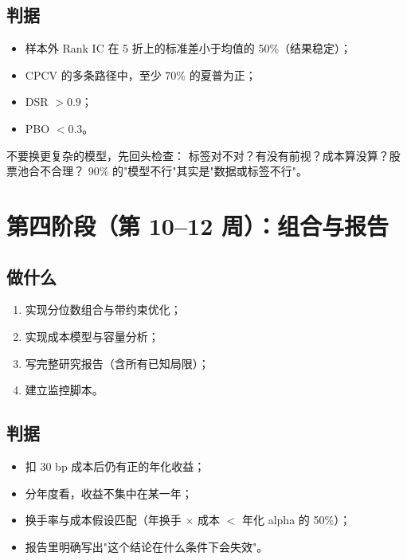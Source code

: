 \subsection{判据}

\begin{itemize}
  \item 样本外 Rank IC 在 5 折上的标准差小于均值的 50\%（结果稳定）；
  \item CPCV 的多条路径中，至少 70\% 的夏普为正；
  \item DSR $>0.9$；
  \item PBO $<0.3$。
\end{itemize}

\begin{warnbox}[如果达不到]
不要换更复杂的模型，先回头检查：
标签对不对？有没有前视？成本算没算？股票池合不合理？
90\% 的"模型不行"其实是"数据或标签不行"。
\end{warnbox}

\section{第四阶段（第 10--12 周）：组合与报告}

\subsection{做什么}

\begin{enumerate}
  \item 实现分位数组合与带约束优化；
  \item 实现成本模型与容量分析；
  \item 写完整研究报告（含所有已知局限）；
  \item 建立监控脚本。
\end{enumerate}

\subsection{判据}

\begin{itemize}
  \item 扣 30 bp 成本后仍有正的年化收益；
  \item 分年度看，收益不集中在某一年；
  \item 换手率与成本假设匹配（年换手 $\times$ 成本 $<$ 年化 alpha 的 50\%）；
  \item 报告里明确写出"这个结论在什么条件下会失效"。
\end{itemize}


